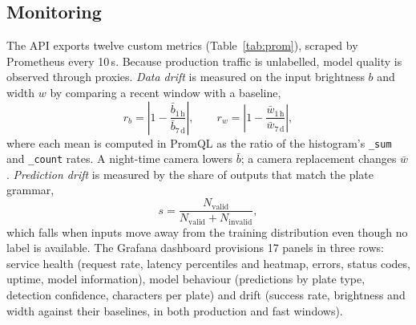 \documentclass[conference]{IEEEtran}
\newcommand{\code}[1]{\texttt{#1}}
\begin{document}
\subsection{Monitoring}
The API exports twelve custom metrics (Table~\ref{tab:prom}), scraped by
Prometheus every 10\,s. Because production traffic is unlabelled, model quality is
observed through proxies. \emph{Data drift} is measured on the input brightness
$b$ and width $w$ by comparing a recent window with a baseline,
\begin{equation}
r_b = \left|1 - \frac{\bar b_{1\,\mathrm{h}}}{\bar b_{7\,\mathrm{d}}}\right|,
\qquad r_w = \left|1 - \frac{\bar w_{1\,\mathrm{h}}}{\bar w_{7\,\mathrm{d}}}\right|,
\label{eq:drift}
\end{equation}
where each mean is computed in PromQL as the ratio of the histogram's
\code{\_sum} and \code{\_count} rates. A night-time camera lowers $\bar b$; a camera
replacement changes $\bar w$. \emph{Prediction drift} is measured by the share of
outputs that match the plate grammar,
\begin{equation}
s = \frac{N_{\text{valid}}}{N_{\text{valid}} + N_{\text{invalid}}},
\label{eq:success}
\end{equation}
which falls when inputs move away from the training distribution even though no
label is available. The Grafana dashboard provisions 17 panels in three rows:
service health (request rate, latency percentiles and heatmap, errors, status
codes, uptime, model information), model behaviour (predictions by plate type,
detection confidence, characters per plate) and drift (success rate, brightness
and width against their baselines, in both production and fast windows).
\end{document}
